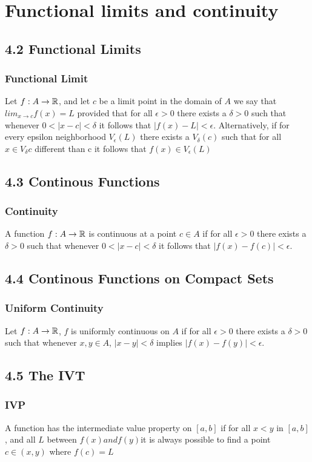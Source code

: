 \documentclass{article}
\begin{document}
\section{Functional limits and continuity}
\subsection*{4.2 Functional Limits}
\subsubsection*{Functional Limit}
Let $f:A\to \protect\mathbb{R}$, and let $c$ be a limit point in the domain of $A$ we say that $lim_{x \to c}f(x)=L$ provided that for all $\epsilon > 0$ there exists a $\delta > 0$ such that whenever $0 < |x-c| < \delta$ it follows that $|f(x) - L| < \epsilon$. Alternatively, if for every epsilon neighborhood $V_{\epsilon}(L)$ there exists a $V_{\delta}(c)$ such that for all $x \in V_{\delta}c$ different than c it follows that $f(x) \in V_{\epsilon}(L)$

\subsection*{4.3 Continous Functions}
\subsubsection*{Continuity}
A function $f:A\to \protect\mathbb{R}$ is continuous at a point $c \in A$ if for all $\epsilon > 0$ there exists a $\delta > 0$ such that whenever $0 < |x-c| < \delta$ it follows that $|f(x) - f(c)| < \epsilon$.

\subsection*{4.4 Continous Functions on Compact Sets}
\subsubsection*{Uniform Continuity}
Let $f:A\to \protect\mathbb{R}$, $f$ is uniformly continuous on $A$ if for all $\epsilon > 0$ there exists a $\delta > 0$ such that whenever $x,y \in A$, $|x-y| < \delta$ implies $|f(x) - f(y)| < \epsilon$.

\subsection*{4.5 The IVT}
\subsubsection*{IVP}
A function has the intermediate value property on $[a,b]$ if for all $x<y$ in $[a,b]$, and all $L$ between $f(x) and f(y)$it is always possible to find a point $c \in (x,y)$ where $f(c)=L$
\end{document}
